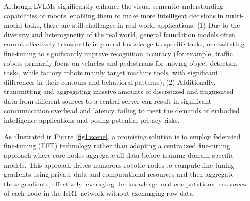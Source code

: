\documentclass[lettersize,journal]{IEEEtran}
\begin{document}
Although LVLMs significantly enhance the visual semantic understanding capabilities of robots, enabling them to make more intelligent decisions in multi-modal tasks, there are still challenges in real-world applications: (1) Due to the diversity and heterogeneity of the real world\cite{dai2023tackling}, general foundation models often cannot effectively transfer their general knowledge to specific tasks, necessitating fine-tuning\cite{fu2023effectiveness} to significantly improve recognition accuracy (for example, traffic robots primarily focus on vehicles and pedestrians for moving object detection tasks, while factory robots mainly target machine tools, with significant differences in their contours and behavioral patterns); (2) Additionally, transmitting and aggregating massive amounts of discretized and fragmented data from different sources to a central server can result in significant communication overhead and latency\cite{zhao2023towards}, failing to meet the demands of embodied intelligence applications and posing potential privacy risks\cite{wen2023survey, khan2023federated}. 

As illustrated in Figure \ref{fig1:scene}, a promising solution is to employ federated fine-tuning (FFT) technology rather than adopting a centralized fine-tuning approach where core nodes aggregate all data before training domain-specific models. This approach drives numerous robotic nodes to compute fine-tuning gradients using private data and computational resources and then aggregate these gradients, effectively leveraging the knowledge and computational resources of each node in the IoRT network without exchanging raw data.
\end{document}
